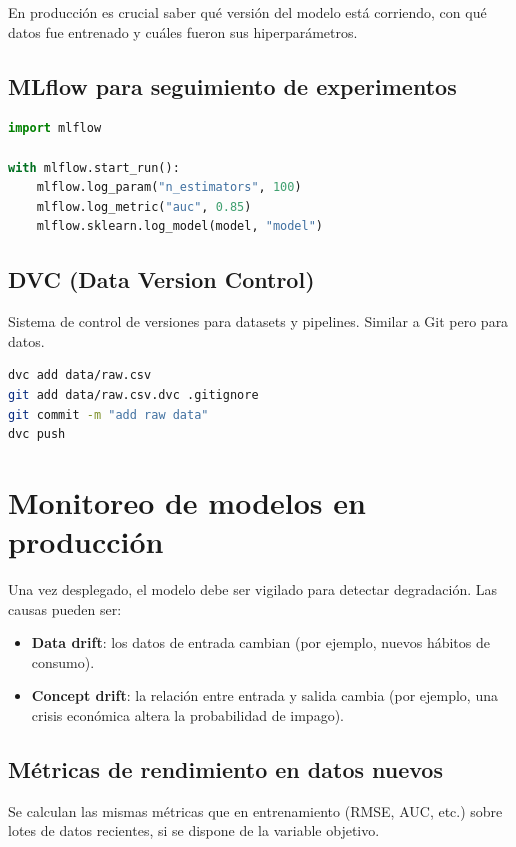 \documentclass[12pt,a4paper,openany,oneside]{book}
\begin{document}
En producción es crucial saber qué versión del modelo está corriendo, con qué datos fue entrenado y cuáles fueron sus hiperparámetros.

\subsection{MLflow para seguimiento de experimentos}
\begin{lstlisting}[language=Python]
import mlflow

with mlflow.start_run():
    mlflow.log_param("n_estimators", 100)
    mlflow.log_metric("auc", 0.85)
    mlflow.sklearn.log_model(model, "model")
\end{lstlisting}

\subsection{DVC (Data Version Control)}
Sistema de control de versiones para datasets y pipelines. Similar a Git pero para datos.

\begin{lstlisting}[language=bash]
dvc add data/raw.csv
git add data/raw.csv.dvc .gitignore
git commit -m "add raw data"
dvc push
\end{lstlisting}

\section{Monitoreo de modelos en producción}

Una vez desplegado, el modelo debe ser vigilado para detectar degradación. Las causas pueden ser:

\begin{itemize}
    \item \textbf{Data drift}: los datos de entrada cambian (por ejemplo, nuevos hábitos de consumo).
    \item \textbf{Concept drift}: la relación entre entrada y salida cambia (por ejemplo, una crisis económica altera la probabilidad de impago).
\end{itemize}

\subsection{Métricas de rendimiento en datos nuevos}
Se calculan las mismas métricas que en entrenamiento (RMSE, AUC, etc.) sobre lotes de datos recientes, si se dispone de la variable objetivo.
\end{document}
